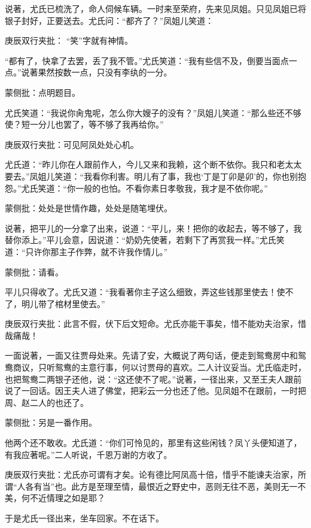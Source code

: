 \begin{parag}


    说著，尤氏已梳洗了，命人伺候车辆。一时来至荣府，先来见凤姐。只见凤姐已将银子封好，正要送去。尤氏问：“都齐了？”凤姐儿笑道：\begin{note}庚辰双行夹批： “笑”字就有神情。\end{note}“都有了，快拿了去罢，丢了我不管。”尤氏笑道：“我有些信不及，倒要当面点一点。”说著果然按数一点，只没有李纨的一分。\begin{note}蒙侧批：点明题目。\end{note}尤氏笑道：“我说你肏鬼呢，怎么你大嫂子的没有？”凤姐儿笑道：“那么些还不够使？短一分儿也罢了，等不够了我再给你。”\begin{note}庚辰双行夹批：可见阿凤处处心机。\end{note}尤氏道：“昨儿你在人跟前作人，今儿又来和我赖，这个断不依你。我只和老太太要去。”凤姐儿笑道：“我看你利害。明儿有了事，我也‘丁是丁卯是卯’的，你也别抱怨。”尤氏笑道：“你一般的也怕。不看你素日孝敬我，我才是不依你呢。”\begin{note}蒙侧批：处处是世情作趣，处处是随笔埋伏。\end{note}说著，把平儿的一分拿了出来，说道：“平儿，来！把你的收起去，等不够了，我替你添上。”平儿会意，因说道：“奶奶先使著，若剩下了再赏我一样。”尤氏笑道：“只许你那主子作弊，就不许我作情儿。”\begin{note}蒙侧批：请看。\end{note}平儿只得收了。尤氏又道：“我看著你主子这么细致，弄这些钱那里使去！使不了，明儿带了棺材里使去。”\begin{note}庚辰双行夹批：此言不假，伏下后文短命。尤氏亦能干事矣，惜不能劝夫治家，惜哉痛哉！\end{note}
\end{parag}


\begin{parag}


    一面说著，一面又往贾母处来。先请了安，大概说了两句话，便走到鸳鸯房中和鸳鸯商议，只听鸳鸯的主意行事，何以讨贾母的喜欢。二人计议妥当。尤氏临走时，也把鸳鸯二两银子还他，说：“这还使不了呢。”说著，一径出来，又至王夫人跟前说了一回话。因王夫人进了佛堂，把彩云一分也还了他。见凤姐不在跟前，一时把周、赵二人的也还了。\begin{note}蒙侧批：另是一番作用。\end{note}他两个还不敢收。尤氏道：“你们可怜见的，那里有这些闲钱？凤丫头便知道了，有我应著呢。”二人听说，千恩万谢的方收了。\begin{note}庚辰双行夹批：尤氏亦可谓有才矣。论有德比阿凤高十倍，惜乎不能谏夫治家，所谓“人各有当”也。此方是至理至情，最恨近之野史中，恶则无往不恶，美则无一不美，何不近情理之如是耶？\end{note}于是尤氏一径出来，坐车回家。不在话下。
\end{parag}


